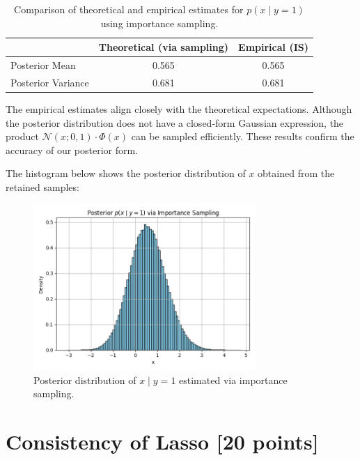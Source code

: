 \documentclass{article}
\begin{document}
\begin{enumerate}
\begin{enumerate}
\begin{table}[H]
\centering
\begin{tabular}{lcc}
\toprule
& Theoretical (via sampling) & Empirical (IS) \\
\midrule
Posterior Mean & 0.565 & 0.565 \\
Posterior Variance & 0.681 & 0.681 \\
\bottomrule
\end{tabular}
\caption{Comparison of theoretical and empirical estimates for \( p(x \mid y=1) \) using importance sampling.}
\end{table}

\vspace{0.5em}

The empirical estimates align closely with the theoretical expectations. Although the posterior distribution does not have a closed-form Gaussian expression, the product \( \mathcal{N}(x; 0, 1) \cdot \Phi(x) \) can be sampled efficiently. These results confirm the accuracy of our posterior form.

The histogram below shows the posterior distribution of \( x \) obtained from the retained samples:

\begin{figure}[H]
    \centering
    \includegraphics[width=0.75\textwidth]{posterior_importance_sampling.png}
    \caption{Posterior distribution of \( x \mid y = 1 \) estimated via importance sampling.}
    \label{fig:posterior-importance}
\end{figure}

\end{enumerate}
\end{enumerate}

\section{Consistency of Lasso [20 points]}
\end{document}
